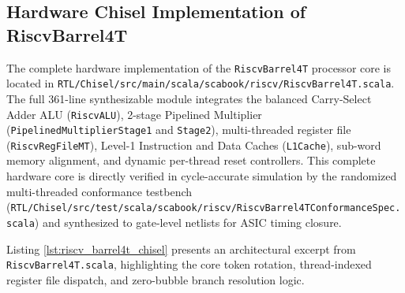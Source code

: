 \subsection{Hardware Chisel Implementation of RiscvBarrel4T}

The complete hardware implementation of the \texttt{RiscvBarrel4T} processor core is located in \texttt{RTL/Chisel/src/main/scala/scabook/riscv/RiscvBarrel4T.scala}. The full 361-line synthesizable module integrates the balanced Carry-Select Adder ALU (\texttt{RiscvALU}), 2-stage Pipelined Multiplier (\texttt{PipelinedMultiplierStage1} and \texttt{Stage2}), multi-threaded register file (\texttt{RiscvRegFileMT}), Level-1 Instruction and Data Caches (\texttt{L1Cache}), sub-word memory alignment, and dynamic per-thread reset controllers. This complete hardware core is directly verified in cycle-accurate simulation by the randomized multi-threaded conformance testbench (\texttt{RTL/Chisel/src/test/scala/scabook/riscv/RiscvBarrel4TConformanceSpec.scala}) and synthesized to gate-level netlists for ASIC timing closure.

Listing \ref{lst:riscv_barrel4t_chisel} presents an architectural excerpt from \texttt{RiscvBarrel4T.scala}, highlighting the core token rotation, thread-indexed register file dispatch, and zero-bubble branch resolution logic.

